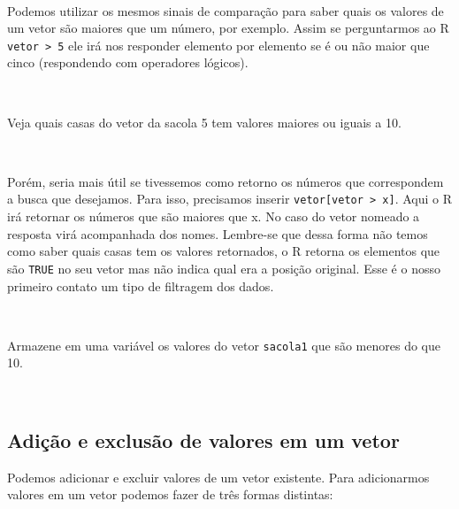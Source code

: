 \documentclass[]{book}
\theoremstyle{definition}
\theoremstyle{definition}
\theoremstyle{definition}
\theoremstyle{remark}
\let\BeginKnitrBlock\begin \let\EndKnitrBlock\end
\begin{document}
~

Podemos utilizar os mesmos sinais de comparação para saber quais os valores de um vetor são maiores que um número, por exemplo. Assim se perguntarmos ao R \texttt{vetor\ \textgreater{}\ 5} ele irá nos responder elemento por elemento se é ou não maior que cinco (respondendo com operadores lógicos).

~

\BeginKnitrBlock{exercise}
\protect\hypertarget{exr:unnamed-chunk-37}{}{\label{exr:unnamed-chunk-37} }Veja quais casas do vetor da sacola 5 tem valores maiores ou iguais a 10.
\EndKnitrBlock{exercise}

~

Porém, seria mais útil se tivessemos como retorno os números que correspondem a busca que desejamos. Para isso, precisamos inserir \texttt{vetor{[}vetor\ \textgreater{}\ x{]}}. Aqui o R irá retornar os números que são maiores que x. No caso do vetor nomeado a resposta virá acompanhada dos nomes. Lembre-se que dessa forma não temos como saber quais casas tem os valores retornados, o R retorna os elementos que são \texttt{TRUE} no seu vetor mas não indica qual era a posição original. Esse é o nosso primeiro contato um tipo de filtragem dos dados.

~

\BeginKnitrBlock{exercise}
\protect\hypertarget{exr:unnamed-chunk-38}{}{\label{exr:unnamed-chunk-38} }Armazene em uma variável os valores do vetor \texttt{sacola1} que são menores do que 10.
\EndKnitrBlock{exercise}

~

\hypertarget{adiuxe7uxe3o-e-exclusuxe3o-de-valores-em-um-vetor}{%
\subsection{Adição e exclusão de valores em um vetor}\label{adiuxe7uxe3o-e-exclusuxe3o-de-valores-em-um-vetor}}

Podemos adicionar e excluir valores de um vetor existente. Para adicionarmos valores em um vetor podemos fazer de três formas distintas:
\end{document}
